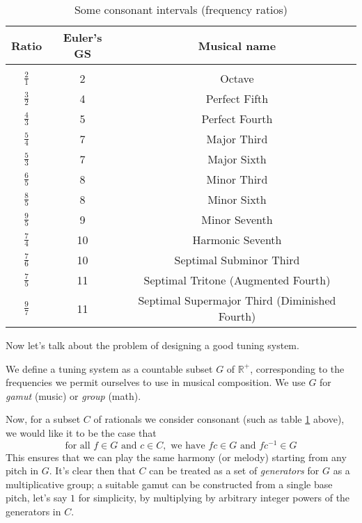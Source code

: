 \documentclass[12pt]{article}
\newcommand{\RR}{\mathbb{R}}      %
\begin{document}
\begin{table}[ht]
\caption{Some consonant intervals (frequency ratios)}
\centering
\begin{tabular}{c c c}

\hline %
Ratio & Euler's GS & Musical name
\\
[0.25ex]
\hline\\[-2ex]
$\tfrac{2}{1}$ & 2 & Octave\\ [0.5ex]
$\frac{3}{2}$ & 4 & Perfect Fifth\\ [0.5ex]
$\tfrac{4}{3}$ & 5 & Perfect Fourth\\ [0.5ex]
$\tfrac{5}{4}$ & 7 & Major Third\\ [0.5ex]
$\tfrac{5}{3}$ & 7 & Major Sixth\\ [0.5ex]
$\tfrac{6}{5}$ & 8 & Minor Third\\ [0.5ex]
$\tfrac{8}{5}$ & 8 & Minor Sixth\\ [0.5ex]
$\tfrac{9}{5}$ & 9 & Minor Seventh\\ [0.5ex]
$\tfrac{7}{4}$ & 10 &Harmonic Seventh\\ [0.5ex]
$\tfrac{7}{6}$ & 10 &Septimal Subminor Third\\ [0.5ex]
$\tfrac{7}{5}$ & 11 &Septimal Tritone (Augmented Fourth)\\ [0.5ex]
$\tfrac{9}{7}$ & 11 &Septimal Supermajor Third (Diminished Fourth)\\
[1ex]
\hline
\end{tabular}
\label{table:intervals}
\end{table}
\par
Now let's talk about the problem of designing a good tuning system.\\
\par
We define a tuning system as a countable subset $G$ of $\RR^+$, corresponding to the frequencies we permit ourselves to use in musical composition.  We use $G$ for \emph{gamut} (music) or \emph{group} (math).\\
\par
Now, for a subset $C$ of rationals we consider consonant (such as table \ref{table:intervals} above), we would like it to be the case that
\[\text{for all } f\in G\text{ and } c\in C,\text{ we have } fc\in G \text{ and }fc^{-1}\in G\]
This ensures that we can play the same harmony (or melody) starting from any pitch in $G$.  It's clear then that $C$ can be treated as a set of \emph{generators} for $G$ as a multiplicative group; a suitable gamut can be constructed from a single base pitch, let's say $1$ for simplicity, by multiplying by arbitrary integer powers of the generators in $C$.\\
\end{document}
